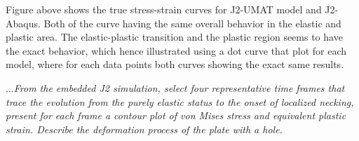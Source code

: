 \documentclass[12pt]{article}
\begin{document}
\hspace{1em} Figure above shows the true stress-strain curves for J2-UMAT model
and J2-Abaqus. Both of the curve having the same overall behavior in the elastic and plastic area.
The elastic-plastic transition and the plastic region seems to have the exact behavior, which hence illustrated
using a dot curve that plot for each model, where for each data points both curves showing the 
exact same results.

\newpage
\vspace{1em}
\textit{$\dots$From the embedded J2 simulation, select four representative time frames that trace the
evolution from the purely elastic status to the onset of localized necking, present for each frame
a contour plot of von Mises stress and equivalent plastic strain. Describe the deformation
process of the plate with a hole.}
\vspace{1em}
\end{document}
